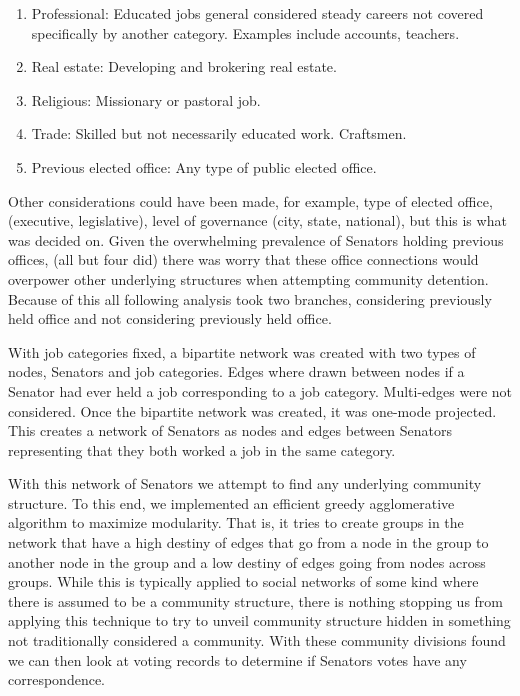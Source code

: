\documentclass[11pt]{article}
\begin{document}
\begin{enumerate}
\begin{enumerate}
\item Professional: Educated jobs general considered steady careers not covered specifically by another category. Examples include accounts, teachers.

\item Real estate: Developing and brokering real estate.

\item Religious: Missionary or pastoral job.

\item Trade: Skilled but not necessarily educated work. Craftsmen.

\item Previous elected office: Any type of public elected office.
\end{enumerate}

Other considerations could have been made, for example, type of elected office, (executive, legislative), level of governance (city, state, national), but this is what was decided on. Given the overwhelming prevalence of Senators holding previous offices, (all but four did) there was worry that these office connections would overpower other underlying structures when attempting community detention. Because of this all following analysis took two branches, considering previously held office and not considering previously held office.

With job categories fixed, a bipartite network was created with two types of nodes, Senators and job categories. Edges where drawn between nodes if a Senator had ever held a job corresponding to a job category. Multi-edges were not considered. Once the bipartite network was created, it was one-mode projected. This creates a network of Senators as nodes and edges between Senators representing that they both worked a job in the same category.

With this network of Senators we attempt to find any underlying community structure. To this end, we implemented an efficient greedy agglomerative algorithm to maximize modularity. That is, it tries to create groups in the network that have a high destiny of edges that go from a node in the group to another node in the group and a low destiny of edges going from nodes across groups. While this is typically applied to social networks of some kind where there is assumed to be a community structure, there is nothing stopping us from applying this technique to try to unveil community structure hidden in something not traditionally considered a community. With these community divisions found we can then look at voting records to determine if Senators votes have any correspondence.


\end{enumerate}
\end{document}
